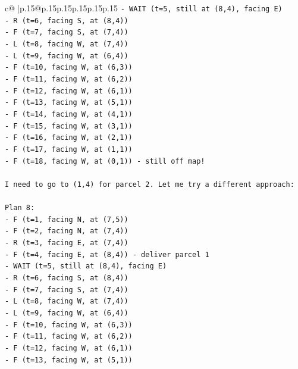 \documentclass{article}
\begin{document}
{\begin{supertabular}{c@{$\;$}|p{.15\linewidth}@{}p{.15\linewidth}p{.15\linewidth}p{.15\linewidth}p{.15\linewidth}p{.15\linewidth}}
{{{\texttt{{-} WAIT (t=5, still at (8,4), facing E)} \\
\texttt{{-} R (t=6, facing S, at (8,4))} \\
\texttt{{-} F (t=7, facing S, at (7,4))} \\
\texttt{{-} L (t=8, facing W, at (7,4))} \\
\texttt{{-} L (t=9, facing W, at (6,4))} \\
\texttt{{-} F (t=10, facing W, at (6,3))} \\
\texttt{{-} F (t=11, facing W, at (6,2))} \\
\texttt{{-} F (t=12, facing W, at (6,1))} \\
\texttt{{-} F (t=13, facing W, at (5,1))} \\
\texttt{{-} F (t=14, facing W, at (4,1))} \\
\texttt{{-} F (t=15, facing W, at (3,1))} \\
\texttt{{-} F (t=16, facing W, at (2,1))} \\
\texttt{{-} F (t=17, facing W, at (1,1))} \\
\texttt{{-} F (t=18, facing W, at (0,1)) {-} still off map!} \\
\\ 
\texttt{I need to go to (1,4) for parcel 2. Let me try a different approach:} \\
\\ 
\texttt{Plan 8:} \\
\texttt{{-} F (t=1, facing N, at (7,5))} \\
\texttt{{-} F (t=2, facing N, at (7,4))} \\
\texttt{{-} R (t=3, facing E, at (7,4))} \\
\texttt{{-} F (t=4, facing E, at (8,4)) {-} deliver parcel 1} \\
\texttt{{-} WAIT (t=5, still at (8,4), facing E)} \\
\texttt{{-} R (t=6, facing S, at (8,4))} \\
\texttt{{-} F (t=7, facing S, at (7,4))} \\
\texttt{{-} L (t=8, facing W, at (7,4))} \\
\texttt{{-} L (t=9, facing W, at (6,4))} \\
\texttt{{-} F (t=10, facing W, at (6,3))} \\
\texttt{{-} F (t=11, facing W, at (6,2))} \\
\texttt{{-} F (t=12, facing W, at (6,1))} \\
\texttt{{-} F (t=13, facing W, at (5,1))} \\
}}}
\end{supertabular}}
\end{document}

